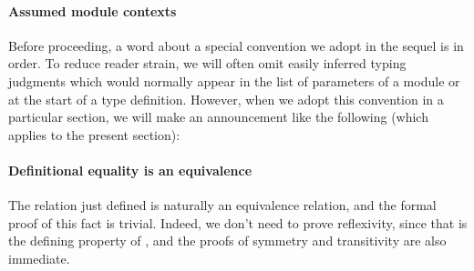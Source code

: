 \paragraph*{Assumed module contexts}
Before proceeding, a word about a special convention we adopt in the sequel is in order. To reduce reader strain, we will often omit easily inferred typing judgments which would normally appear in the list of parameters of a module or at the start of a type definition.  However, when we adopt this convention in a particular section, we will make an announcement like the following (which applies to the present section):
\paragraph*{Definitional equality is an equivalence}
The relation  just defined is naturally an equivalence relation, and the formal proof of this fact is trivial. Indeed, we don't need to prove reflexivity, since that is the defining property of , and the proofs of symmetry and transitivity are also immediate.
\ccpad
